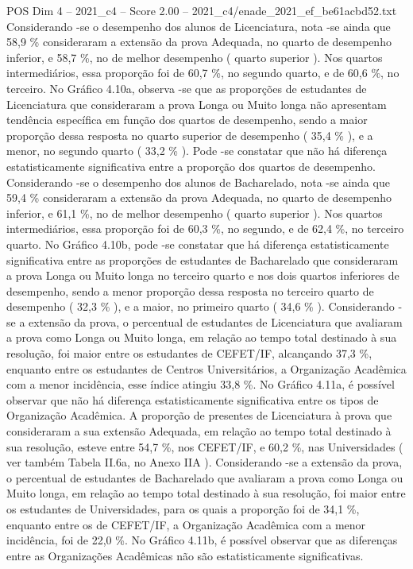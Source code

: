 \begin{textsample}{POS Dim 4 – 2021\_c4 – Score 2.00 – 2021\_c4/enade\_2021\_ef\_be61acbd52.txt}
Considerando -se o desempenho dos alunos de Licenciatura, nota -se ainda que 58,9 \% consideraram a extensão da prova Adequada, no quarto de desempenho inferior, e 58,7 \%, no de melhor desempenho ( quarto superior ).
Nos quartos intermediários, essa proporção foi de 60,7 \%, no segundo quarto, e de 60,6 \%, no terceiro.
No Gráfico 4.10a, observa -se que as proporções de estudantes de Licenciatura que consideraram a prova Longa ou Muito longa não apresentam tendência específica em função dos quartos de desempenho, sendo a maior proporção dessa resposta no quarto superior de desempenho ( 35,4 \% ), e a menor, no segundo quarto ( 33,2 \% ).
Pode -se constatar que não há diferença estatisticamente significativa entre a proporção dos quartos de desempenho.
Considerando -se o desempenho dos alunos de Bacharelado, nota -se ainda que 59,4 \% consideraram a extensão da prova Adequada, no quarto de desempenho inferior, e 61,1 \%, no de melhor desempenho ( quarto superior ).
Nos quartos intermediários, essa proporção foi de 60,3 \%, no segundo, e de 62,4 \%, no terceiro quarto.
No Gráfico 4.10b, pode -se constatar que há diferença estatisticamente significativa entre as proporções de estudantes de Bacharelado que consideraram a prova Longa ou Muito longa no terceiro quarto e nos dois quartos inferiores de desempenho, sendo a menor proporção dessa resposta no terceiro quarto de desempenho ( 32,3 \% ), e a maior, no primeiro quarto ( 34,6 \% ).
Considerando -se a extensão da prova, o percentual de estudantes de Licenciatura que avaliaram a prova como Longa ou Muito longa, em relação ao tempo total destinado à sua resolução, foi maior entre os estudantes de CEFET/IF, alcançando 37,3 \%, enquanto entre os estudantes de Centros Universitários, a Organização Acadêmica com a menor incidência, esse índice atingiu 33,8 \%.
No Gráfico 4.11a, é possível observar que não há diferença estatisticamente significativa entre os tipos de Organização Acadêmica.
A proporção de presentes de Licenciatura à prova que consideraram a sua extensão Adequada, em relação ao tempo total destinado à sua resolução, esteve entre 54,7 \%, nos CEFET/IF, e 60,2 \%, nas Universidades ( ver também Tabela II.6a, no Anexo IIA ).
Considerando -se a extensão da prova, o percentual de estudantes de Bacharelado que avaliaram a prova como Longa ou Muito longa, em relação ao tempo total destinado à sua resolução, foi maior entre os estudantes de Universidades, para os quais a proporção foi de 34,1 \%, enquanto entre os de CEFET/IF, a Organização Acadêmica com a menor incidência, foi de 22,0 \%.
No Gráfico 4.11b, é possível observar que as diferenças entre as Organizações Acadêmicas não são estatisticamente significativas.

\end{textsample}
